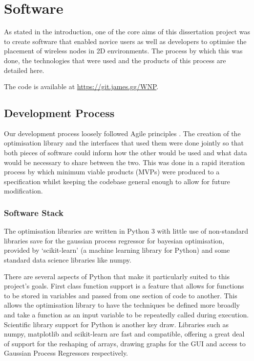\section{Software}
	\label{sec:software}
	As stated in the introduction, one of the core aims of this dissertation project was to create software that enabled novice users as well as developers to optimise the placement of wireless nodes in 2D environments. The process by which this was done, the technologies that were used and the products of this process are detailed here. 
	
	The code is available at \url{https://git.james.gg/WNP}.
	
	\subsection{Development Process}
		\label{sec:software_dev_process}
		Our development process loosely followed Agile principles \cite{agilemanifesto}. The creation of the optimisation library and the interfaces that used them were done jointly so that both pieces of software could inform how the other would be used and what data would be necessary to share between the two. This was done in a rapid iteration process by which minimum viable products (MVPs) were produced to a specification whilst keeping the codebase general enough to allow for future modification. 
	
	\subsubsection{Software Stack}
		\label{sec:software_stack}
		The optimisation libraries are written in Python 3 with little use of non-standard libraries save for the gaussian process regressor for bayesian optimisation, provided by `scikit-learn'\cite{pedregosa2011scikit} (a machine learning library for Python) and some standard data science libraries like numpy\cite{numpy2020}.

		There are several aspects of Python that make it particularly suited to this project's goals. First class function support is a feature that allows for functions to be stored in variables and passed from one section of code to another. This allows the optimisation library to have the techniques be defined more broadly and take a function as an input variable to be repeatedly called during execution. Scientific library support for Python is another key draw. Libraries such as numpy, matplotlib\cite{hunter2007matplotlib} and scikit-learn are fast and compatible, offering a great deal of support for the reshaping of arrays, drawing graphs for the GUI and access to Gaussian Process Regressors respectively.


